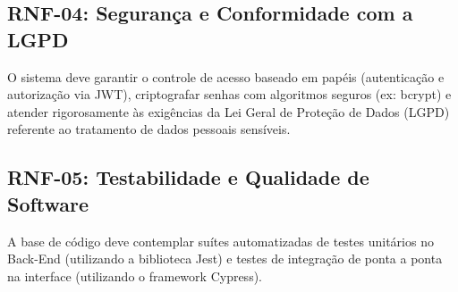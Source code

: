 \documentclass[
    12pt,               %
    a4paper,            %
    oneside,
    brazil              %
]{abntex2}
\begin{document}
\subsection{RNF-04: Segurança e Conformidade com a LGPD}
O sistema deve garantir o controle de acesso baseado em papéis (autenticação e autorização via JWT), criptografar senhas com algoritmos seguros (ex: bcrypt) e atender rigorosamente às exigências da Lei Geral de Proteção de Dados (LGPD) referente ao tratamento de dados pessoais sensíveis.

\subsection{RNF-05: Testabilidade e Qualidade de Software}
A base de código deve contemplar suítes automatizadas de testes unitários no Back-End (utilizando a biblioteca Jest) e testes de integração de ponta a ponta na interface (utilizando o framework Cypress).
\end{document}
